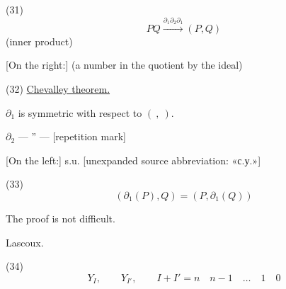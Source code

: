 (31)
\begin{equation*}
PQ\overset{\partial_1\partial_2\partial_1}{\longrightarrow}(P,Q)
\end{equation*}
(inner product)

[On the right:] (a number in the quotient by the ideal)

(32) \underline{Chevalley theorem.}

$\partial_1$ is symmetric with respect to $(\ ,\ )$.

$\partial_2$ --- '' --- [repetition mark]

[On the left:] s.u. [unexpanded source abbreviation: «с.у.»]

(33)
\begin{equation*}
(\partial_1(P),Q)=(P,\partial_1(Q))
\end{equation*}

The proof is not difficult.

Lascoux.

(34)
\begin{equation*}
Y_I,\qquad Y_{I'},\qquad I+I'=n\quad n-1\quad\dots\quad1\quad0
\end{equation*}

